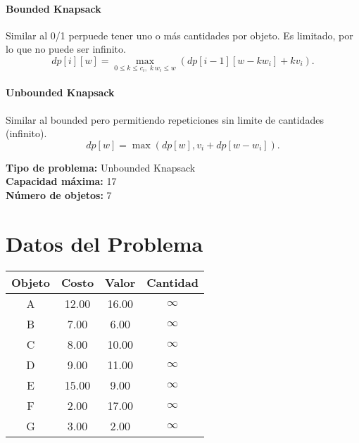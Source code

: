 \documentclass{article}
\begin{document}
\paragraph{Bounded Knapsack} Similar al 0/1 perpuede tener uno o más cantidades por objeto. Es limitado, por lo que no puede ser infinito.
\[
dp[i][w] = 
\max_{0 \leq k \leq c_i,\; k\,w_i \leq w} \left( dp[i-1][w - k w_i] + k v_i \right).
\]

\paragraph{Unbounded Knapsack} Similar al bounded pero permitiendo repeticiones sin limite de cantidades (infinito).
\[
dp[w] = \max ( dp[w], v_i + dp[w - w_i] ).
\]

\thispagestyle{empty}
\newpage
\textbf{Tipo de problema:} Unbounded Knapsack\\
\textbf{Capacidad máxima:} 17\\
\textbf{Número de objetos:} 7\\

\section*{Datos del Problema}
\begin{tabular}{|c|c|c|c|}
\hline
Objeto & Costo & Valor & Cantidad \\
\hline
A & 12.00 & 16.00 & $\infty$ \\
B & 7.00 & 6.00 & $\infty$ \\
C & 8.00 & 10.00 & $\infty$ \\
D & 9.00 & 11.00 & $\infty$ \\
E & 15.00 & 9.00 & $\infty$ \\
F & 2.00 & 17.00 & $\infty$ \\
G & 3.00 & 2.00 & $\infty$ \\
\hline
\end{tabular}
\end{document}
